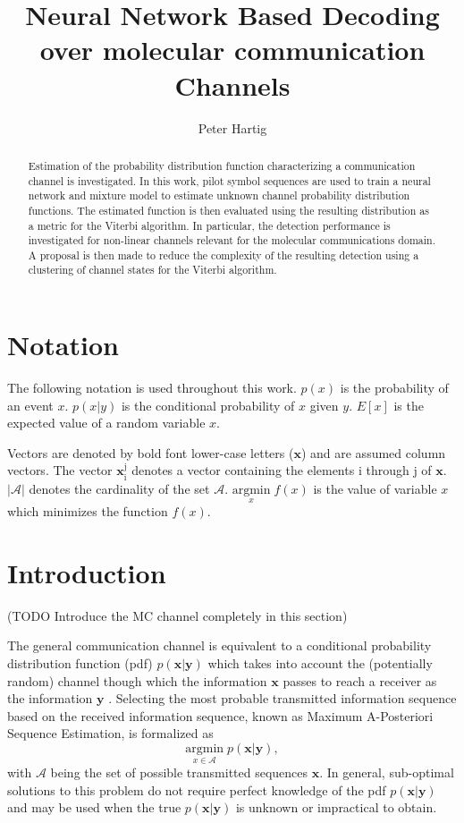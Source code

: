 \documentclass[12pt,a4paper]{report}
\title{Neural Network Based Decoding over molecular communication Channels}
\author{Peter Hartig}
\begin{document}
\maketitle

\begin{abstract}
Estimation of the probability distribution function characterizing a communication channel is investigated. In this work, pilot symbol sequences are used to train a neural network and mixture model to estimate unknown channel probability distribution functions. The estimated function is then evaluated using the resulting distribution as a metric for the Viterbi algorithm. In particular, the detection performance is investigated for non-linear channels relevant for the molecular communications domain. A proposal is then made to reduce the complexity of the resulting detection using a clustering of channel states for the Viterbi algorithm. 
\end{abstract}

\newpage
\tableofcontents
\newpage
\section{Notation}
The following notation is used throughout this work.
$p(x)$ is the probability of an event $x$.
$p(x|y)$ is the conditional probability of $x$ given $y$.
$E[x]$ is the expected value of a random variable $x$.

Vectors are denoted by bold font lower-case letters ($\mathbf{x}$) and are assumed column vectors.
The vector $\mathbf{x}_{\mathrm{i}}^{\mathrm{j}}$ denotes a vector containing the elements i through j of $\mathbf{x}$. $|\mathcal{A}|$ denotes the cardinality of the set $\mathcal{A}$.
$\underset{x}{\text{argmin}} \; f(x)$ is the value of variable $x$ which minimizes the function $f(x)$.

\section{Introduction}
(TODO Introduce the MC channel completely in this section)

\par
The general communication channel is equivalent to a conditional probability distribution function (pdf) $p(\mathbf{x}|\mathbf{y})$ which takes into account the (potentially random) channel though which the information $\mathbf{x}$ passes to reach a receiver as the information $\mathbf{y}$ \cite[Ch.~7]{cover2012elements}. Selecting the most probable transmitted information sequence based on the received information sequence, known as Maximum A-Posteriori Sequence Estimation, is formalized as
\begin{equation*}
\underset{x\in\mathcal{A}}{\text{argmin}} \; p(\mathbf{x}|\mathbf{y}),
\end{equation*} with $\mathcal{A}$ being the set of possible transmitted sequences $\mathbf{x}$. In general, sub-optimal solutions to this problem do not require perfect knowledge of the pdf $p(\mathbf{x}|\mathbf{y})$ and may be used when the true $p(\mathbf{x}|\mathbf{y})$ is unknown or impractical to obtain.
\end{document}
